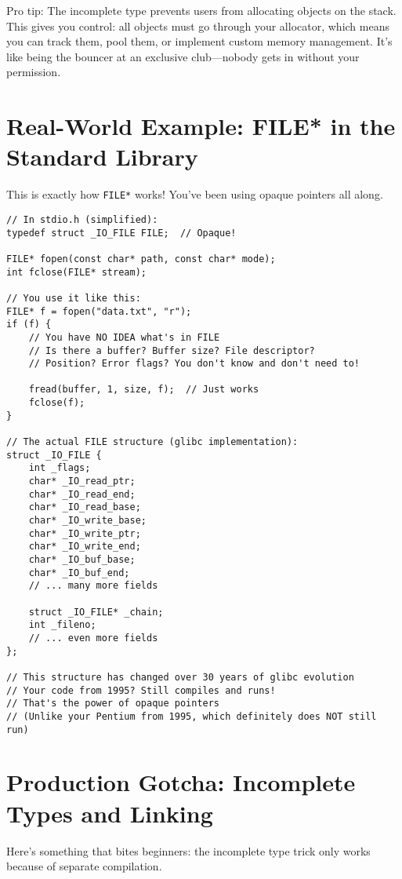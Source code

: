 \begin{tipbox}
Pro tip: The incomplete type prevents users from allocating objects on the stack. This gives you control: all objects must go through your allocator, which means you can track them, pool them, or implement custom memory management. It's like being the bouncer at an exclusive club—nobody gets in without your permission.
\end{tipbox}

\section{Real-World Example: FILE* in the Standard Library}

This is exactly how \texttt{FILE*} works! You've been using opaque pointers all along.

\begin{lstlisting}
// In stdio.h (simplified):
typedef struct _IO_FILE FILE;  // Opaque!

FILE* fopen(const char* path, const char* mode);
int fclose(FILE* stream);

// You use it like this:
FILE* f = fopen("data.txt", "r");
if (f) {
    // You have NO IDEA what's in FILE
    // Is there a buffer? Buffer size? File descriptor?
    // Position? Error flags? You don't know and don't need to!

    fread(buffer, 1, size, f);  // Just works
    fclose(f);
}

// The actual FILE structure (glibc implementation):
struct _IO_FILE {
    int _flags;
    char* _IO_read_ptr;
    char* _IO_read_end;
    char* _IO_read_base;
    char* _IO_write_base;
    char* _IO_write_ptr;
    char* _IO_write_end;
    char* _IO_buf_base;
    char* _IO_buf_end;
    // ... many more fields

    struct _IO_FILE* _chain;
    int _fileno;
    // ... even more fields
};

// This structure has changed over 30 years of glibc evolution
// Your code from 1995? Still compiles and runs!
// That's the power of opaque pointers
// (Unlike your Pentium from 1995, which definitely does NOT still run)
\end{lstlisting}

\section{Production Gotcha: Incomplete Types and Linking}

Here's something that bites beginners: the incomplete type trick only works because of separate compilation.

